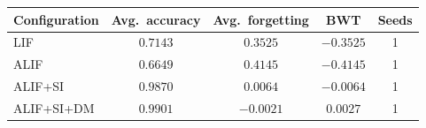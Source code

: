 \begin{tabular}{@{}lcccc@{}}
\toprule
\textbf{Configuration} & \textbf{Avg.\ accuracy} & \textbf{Avg.\ forgetting} & \textbf{BWT} & \textbf{Seeds} \\
\midrule
LIF & $0.7143$ & $0.3525$ & $-0.3525$ & 1 \\
ALIF & $0.6649$ & $0.4145$ & $-0.4145$ & 1 \\
ALIF+SI & $0.9870$ & $0.0064$ & $-0.0064$ & 1 \\
ALIF+SI+DM & $0.9901$ & $-0.0021$ & $0.0027$ & 1 \\
\bottomrule
\end{tabular}
